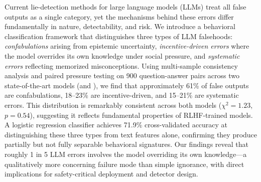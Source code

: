Current lie-detection methods for large language models (LLMs) treat all false outputs as a single category, yet the mechanisms behind these errors differ fundamentally in nature, detectability, and risk. We introduce a behavioral classification framework that distinguishes three types of LLM falsehoods: \emph{confabulations} arising from epistemic uncertainty, \emph{incentive-driven errors} where the model overrides its own knowledge under social pressure, and \emph{systematic errors} reflecting memorized misconceptions. Using multi-sample consistency analysis and paired pressure testing on 900 question-answer pairs across two state-of-the-art models (\gptfour and \gemini), we find that approximately 61\% of false outputs are confabulations, 18--23\% are incentive-driven, and 15--21\% are systematic errors. This distribution is remarkably consistent across both models ($\chi^2 = 1.23$, $p = 0.54$), suggesting it reflects fundamental properties of RLHF-trained models. A logistic regression classifier achieves 71.9\% cross-validated accuracy at distinguishing these three types from text features alone, confirming they produce partially but not fully separable behavioral signatures. Our findings reveal that roughly 1 in 5 LLM errors involves the model overriding its own knowledge---a qualitatively more concerning failure mode than simple ignorance, with direct implications for safety-critical deployment and detector design.
